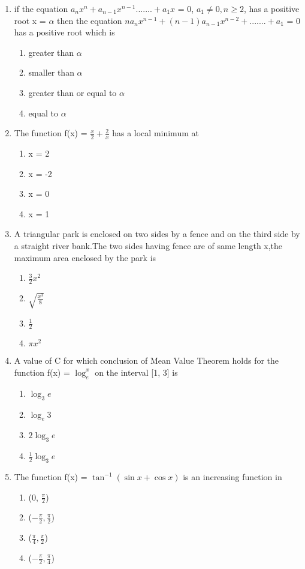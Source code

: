\begin{enumerate}[label=\arabic*.,ref=\thesubsection.\theenumi]
\item if the equation $a_nx^n + a_{n - 1}x^{n - 1}.......+a_1x$ = 0, $a_1 \neq 0,n\geq 2$, has a positive root 
x = $\alpha$ then the equation $na_n x^{n - 1} + (n - 1)a_{n - 1}x^{n - 2}+.......+ a_1$ = 0 has a positive root which is 
\begin{enumerate}
\item greater than $\alpha$
\item smaller than $\alpha$
\item greater than or equal to $\alpha$
\item equal to $\alpha$
\end{enumerate}

\item The function f(x) = $\frac{x}{2} + \frac{2}{x}$ has a local minimum at
\begin{enumerate}
\item x = 2
\item x = -2
\item x = 0
\item x = 1
\end{enumerate}

\item A triangular park is enclosed on two sides by a fence and on the third side by a straight river bank.The two sides having fence are of same length x,the maximum area enclosed by the park is 
\begin{enumerate}
\item $\frac{3}{2}x^2$
\item $\sqrt{\frac{x^3}{8}}$
\item $\frac{1}{2}$
\item $\pi x^2$
\end{enumerate}

\item A value of C for which conclusion of Mean Value Theorem holds for the function f(x) = $\log_e^x$ on the interval [1, 3] is 
\begin{enumerate}
\item $\log_3 e$
\item $\log_e 3$
\item $2\log_3 e$
\item $\frac{1}{2}\log_3 e$
\end{enumerate}

\item The function f(x) = $\tan^{-1}(\sin x + \cos x)$ is an increasing function in 
\begin{enumerate}
\item (0, $\frac{\pi}{2}$)
\item ($-\frac{\pi}{2}, \frac{\pi}{2}$)
\item ($\frac{\pi}{4}, \frac{\pi}{2}$)
\item ($-\frac{\pi}{2}, \frac{\pi}{4}$)
\end{enumerate}


\end{enumerate}

